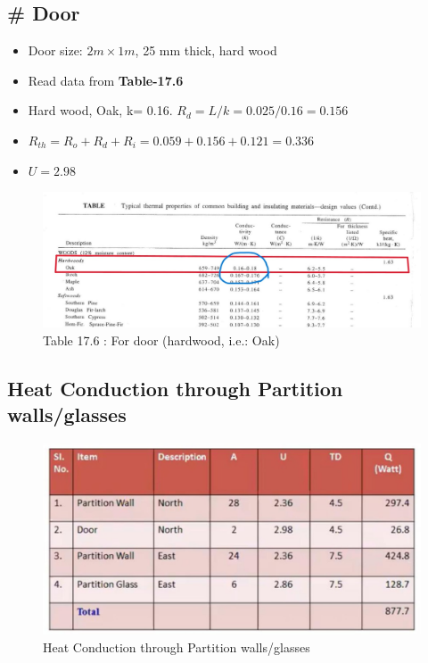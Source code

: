 \documentclass{article}
\begin{document}
\vspace*{1cm}
\subsection*{\# Door}
\begin{itemize}
  \item Door size: $2 m \times 1 m$, 25 mm thick, hard wood
  \item Read data from \textbf{Table-17.6}
  \item Hard wood, Oak, k= 0.16. $R_d = L/k = 0.025/0.16 = 0.156$
  \item $R_{th} = R_o + R_d + R_i = 0.059 + 0.156 + 0.121 = 0.336$
  \item $U = 2.98$
\end{itemize}

\begin{figure}[H]
  \begin{center}
    \includegraphics[width=\columnwidth]{img/door.jpeg}
    \caption{Table 17.6 : For door (hardwood, i.e.: Oak)}
  \end{center}
\end{figure}
\vspace*{1cm}

\subsection*{Heat Conduction through Partition walls/glasses}
\begin{figure}[H]
  \begin{center}
    \includegraphics[width=\columnwidth]{img/head_conduction.jpeg}
    \caption{Heat Conduction through Partition walls/glasses}
  \end{center}
\end{figure}
\end{document}
